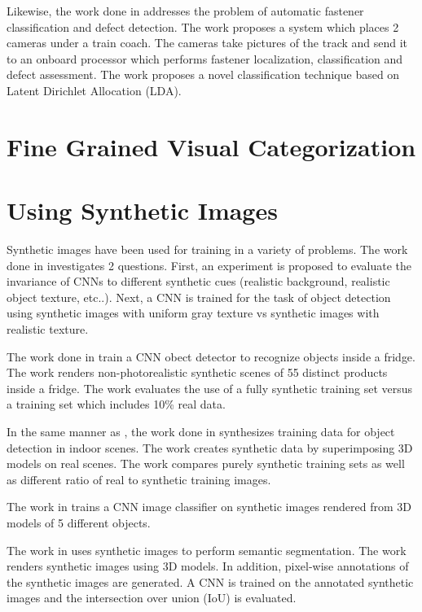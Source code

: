 Likewise, the work done in \cite{feng2014automatic} addresses the problem of automatic fastener classification and defect detection. The work proposes a system which places 2 cameras under a train coach. The cameras take pictures of the track and send it to an onboard processor which performs fastener localization, classification and defect assessment. The work proposes a novel classification technique based on Latent Dirichlet Allocation (LDA).

\section{Fine Grained Visual Categorization}

\section{Using Synthetic Images}
Synthetic images have been used for training in a variety of problems. The work done in \cite{peng2015learning} investigates 2 questions. First, an experiment is proposed to evaluate the invariance of CNNs to different synthetic cues (realistic background, realistic object texture, etc..). Next, a CNN is trained for the task of object detection using synthetic images with uniform gray texture vs synthetic images with realistic texture.

The work done in \cite{rajpura2017object} train a CNN obect detector to recognize objects inside a fridge. The work renders non-photorealistic synthetic scenes of 55 distinct products inside a fridge. The work evaluates the use of a fully synthetic training set versus a training set which includes 10\% real data.

In the same manner as \cite{rajpura2017object}, the work done in \cite{georgakis2017synthesizing} synthesizes training data for object detection in indoor scenes. The work creates synthetic data by superimposing 3D models on real scenes. The work compares purely synthetic training sets as well as different ratio of real to synthetic training images.

The work in \cite{sarkar2017trained} trains a CNN image classifier on synthetic images rendered from 3D models of 5 different objects.

The work in \cite{goyal2017dataset} uses synthetic images to perform semantic segmentation. The work renders synthetic images using 3D models. In addition, pixel-wise annotations of the synthetic images are generated. A CNN is trained on the annotated synthetic images and the intersection over union (IoU) is evaluated.